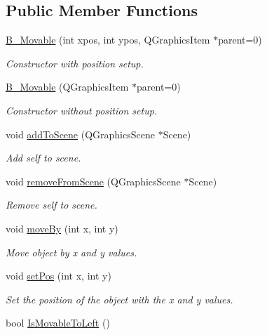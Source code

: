 \subsection*{Public Member Functions}
\begin{DoxyCompactItemize}
\item 
\hyperlink{class_b___movable_ac874fc12d19502117d0bfc396d1059d2}{B\+\_\+\+Movable} (int xpos, int ypos, Q\+Graphics\+Item $\ast$parent=0)
\begin{DoxyCompactList}\small\item\em Constructor with position setup. \end{DoxyCompactList}\item 
\hyperlink{class_b___movable_aef88fa8933731c08731796a9ee3fda6b}{B\+\_\+\+Movable} (Q\+Graphics\+Item $\ast$parent=0)
\begin{DoxyCompactList}\small\item\em Constructor without position setup. \end{DoxyCompactList}\item 
void \hyperlink{class_b___movable_a8a23ac4b1692d95607dcccd6d6c9a973}{add\+To\+Scene} (Q\+Graphics\+Scene $\ast$Scene)
\begin{DoxyCompactList}\small\item\em Add self to scene. \end{DoxyCompactList}\item 
void \hyperlink{class_b___movable_aa4d26e877655021ef70bc6914fe04418}{remove\+From\+Scene} (Q\+Graphics\+Scene $\ast$Scene)
\begin{DoxyCompactList}\small\item\em Remove self to scene. \end{DoxyCompactList}\item 
void \hyperlink{class_b___movable_a55fb8069fc55c4edabd2ac076acdee17}{move\+By} (int x, int y)
\begin{DoxyCompactList}\small\item\em Move object by x and y values. \end{DoxyCompactList}\item 
void \hyperlink{class_b___movable_aca717ec608426940422f1bc658201bf5}{set\+Pos} (int x, int y)
\begin{DoxyCompactList}\small\item\em Set the position of the object with the x and y values. \end{DoxyCompactList}\item 
bool \hyperlink{class_b___movable_a96a0a18c27314600a19d467b6f7820a3}{Is\+Movable\+To\+Left} ()

\end{DoxyCompactItemize}
